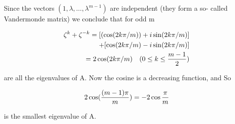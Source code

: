 \documentclass[12pt]{memoir}
\newcommand{\setnewpagemargins}{
    \clearpage
    \checkandfixthelayout
}
\begin{document}
\begin{mdframed}[nobreak=true]
\begin{equation*}
\end{equation*}

Since the vectors $(1, \lambda, \ldots, \lambda^{m-1})$ are independent (they form a so-
called Vandermonde matrix) we conclude that for odd m

\begin{equation*} 
\begin{align}
\zeta^k + \zeta^{-k} = [(\cos(2k\pi / m)) + i\sin(2k\pi / m)]\\
+[\cos(2k\pi/m) - i\sin(2k\pi / m)]\\
=  2\cos(2k\pi / m) \quad (0 \leq k \leq {{m-1} \over 2})
\end{align}
\end{equation*}

are all the eigenvalues of A. Now the cosine is a decreasing function,
and So

\[
2\cos({{(m-1)\pi} \over m}) = -2\cos{\pi \over m}
\]

is the smallest eigenvalue of A. 

\vspace{5pt}
\end{mdframed}

\setnewpagemargins


\cite{linear}
\cite{methods}
\cite{graph}
\cite{noisy}
\printbibliography

 
 
\end{document}
